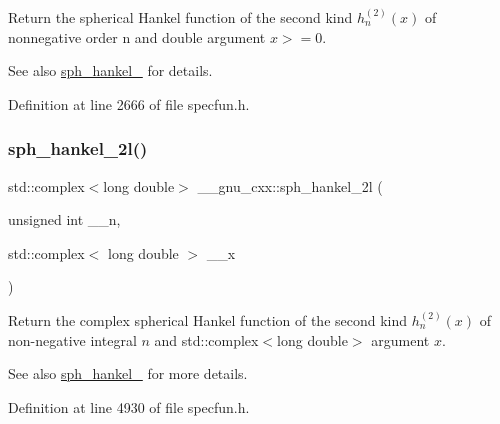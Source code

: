 Return the spherical Hankel function of the second kind $ h^{(2)}_n(x)$ of nonnegative order n and { double} argument $ x >= 0 $.

\begin{DoxySeeAlso}{See also}
\hyperlink{group__gnu__math__spec__func_ga1ca08866a25e3637b04c57ff5a0c36a5}{sph\+\_\+hankel\+\_} for details. 
\end{DoxySeeAlso}


Definition at line 2666 of file specfun.\+h.

\mbox{\label{group__gnu__math__spec__func_ga3d9d9aaceba455a5ddc79d178ee1cb6d}} 
\subsubsection{\texorpdfstring{sph\+\_\+hankel\+\_\+2l()}{sph\_hankel\_2l()}\hspace{0.1cm}{\footnotesize\ttfamily [2/2]}}
{\footnotesize\ttfamily std\+::complex$<$long double$>$ \+\_\+\+\_\+gnu\+\_\+cxx\+::sph\+\_\+hankel\+\_\+2l (\begin{DoxyParamCaption}\item[{unsigned int}]{\+\_\+\+\_\+n,  }\item[{std\+::complex$<$ long double $>$}]{\+\_\+\+\_\+x }\end{DoxyParamCaption})\hspace{0.3cm}{\ttfamily [inline]}}

Return the complex spherical Hankel function of the second kind $ h^{(2)}_n(x) $ of non-\/negative integral $ n $ and {\ttfamily std\+::complex$<$long double$>$} argument $ x $.

\begin{DoxySeeAlso}{See also}
\hyperlink{group__gnu__math__spec__func_ga1ca08866a25e3637b04c57ff5a0c36a5}{sph\+\_\+hankel\+\_} for more details. 
\end{DoxySeeAlso}


Definition at line 4930 of file specfun.\+h.

\mbox{\label{group__gnu__math__spec__func_gacbff28988d5d36f0c3b3fe03d4f57896}} 

